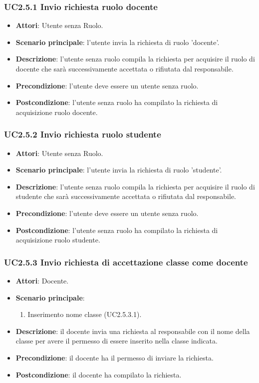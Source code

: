 \subsubsection{UC2.5.1 Invio richiesta ruolo docente}
\begin{itemize}
\item \textbf{Attori}: Utente senza Ruolo.
\item \textbf{Scenario principale}: l'utente invia la richiesta di ruolo 'docente'.
\item \textbf{Descrizione}: l'utente senza ruolo compila la richiesta per acquisire il ruolo di docente che sarà successivamente accettata  o rifiutata dal responsabile.
\item \textbf{Precondizione}: l'utente deve essere un utente senza ruolo.
\item \textbf{Postcondizione}: l'utente senza ruolo ha compilato la richiesta di acquisizione ruolo docente.
\end{itemize}
\subsubsection{UC2.5.2 Invio richiesta ruolo studente}
\begin{itemize}
\item \textbf{Attori}: Utente senza Ruolo.
\item \textbf{Scenario principale}: l'utente invia la richiesta di ruolo 'studente'.
\item \textbf{Descrizione}: l'utente senza ruolo compila la richiesta per acquisire il ruolo di studente che sarà successivamente accettata o rifiutata dal responsabile.
\item \textbf{Precondizione}: l'utente deve essere un utente senza ruolo.
\item \textbf{Postcondizione}: l'utente senza ruolo ha compilato la richiesta di acquisizione ruolo studente.
\end{itemize}
\subsubsection{UC2.5.3 Invio richiesta di accettazione classe come docente}
\begin{itemize}
\item \textbf{Attori}: Docente.
\item \textbf{Scenario principale}:
\begin{enumerate}
\item Inserimento nome classe (UC2.5.3.1).
\end{enumerate}
\item \textbf{Descrizione}: il docente invia una richiesta al responsabile con il nome della classe per avere il permesso di essere inserito nella classe indicata.
\item \textbf{Precondizione}: il docente ha il permesso di inviare la richiesta.
\item \textbf{Postcondizione}: il docente ha compilato la richiesta.
\end{itemize}
